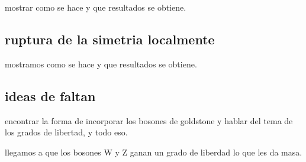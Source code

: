 mostrar como se hace y que resultados se obtiene.

\subsection{ruptura de la simetria localmente}

mostramos como se hace y que resultados se obtiene.

\subsection{ideas de faltan}

encontrar la forma de incorporar los bosones de goldstone y hablar del tema de los grados de libertad, y todo eso.

llegamos a que los bosones W y Z ganan un grado de liberdad lo que les da masa.





